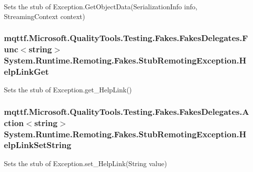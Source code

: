 Sets the stub of Exception.\-Get\-Object\-Data(\-Serialization\-Info info, Streaming\-Context context)

\hypertarget{class_system_1_1_runtime_1_1_remoting_1_1_fakes_1_1_stub_remoting_exception_acdeb46d59f5f2ebd31d85a875fed2034}{
\subsubsection[{Help\-Link\-Get}]{\setlength{\rightskip}{0pt plus 5cm}mqttf.\-Microsoft.\-Quality\-Tools.\-Testing.\-Fakes.\-Fakes\-Delegates.\-Func$<$string$>$ System.\-Runtime.\-Remoting.\-Fakes.\-Stub\-Remoting\-Exception.\-Help\-Link\-Get}}\label{class_system_1_1_runtime_1_1_remoting_1_1_fakes_1_1_stub_remoting_exception_acdeb46d59f5f2ebd31d85a875fed2034}


Sets the stub of Exception.\-get\-\_\-\-Help\-Link()

\hypertarget{class_system_1_1_runtime_1_1_remoting_1_1_fakes_1_1_stub_remoting_exception_a05cadc0759b4c4a601da9e39d73c3f8d}{
\subsubsection[{Help\-Link\-Set\-String}]{\setlength{\rightskip}{0pt plus 5cm}mqttf.\-Microsoft.\-Quality\-Tools.\-Testing.\-Fakes.\-Fakes\-Delegates.\-Action$<$string$>$ System.\-Runtime.\-Remoting.\-Fakes.\-Stub\-Remoting\-Exception.\-Help\-Link\-Set\-String}}\label{class_system_1_1_runtime_1_1_remoting_1_1_fakes_1_1_stub_remoting_exception_a05cadc0759b4c4a601da9e39d73c3f8d}


Sets the stub of Exception.\-set\-\_\-\-Help\-Link(\-String value)

